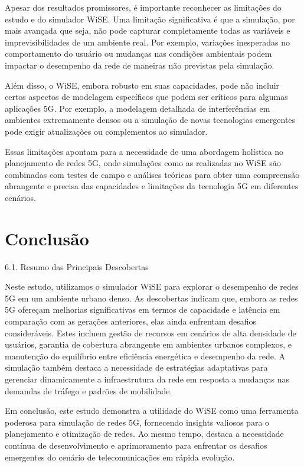 \documentclass[journal]{IEEEtran}
\begin{document}
Apesar dos resultados promissores, é importante reconhecer as limitações do estudo e do simulador WiSE. Uma limitação significativa é que a simulação, por mais avançada que seja, não pode capturar completamente todas as variáveis e imprevisibilidades de um ambiente real. Por exemplo, variações inesperadas no comportamento do usuário ou mudanças nas condições ambientais podem impactar o desempenho da rede de maneiras não previstas pela simulação.

Além disso, o WiSE, embora robusto em suas capacidades, pode não incluir certos aspectos de modelagem específicos que podem ser críticos para algumas aplicações 5G. Por exemplo, a modelagem detalhada de interferências em ambientes extremamente densos ou a simulação de novas tecnologias emergentes pode exigir atualizações ou complementos ao simulador.

Essas limitações apontam para a necessidade de uma abordagem holística no planejamento de redes 5G, onde simulações como as realizadas no WiSE são combinadas com testes de campo e análises teóricas para obter uma compreensão abrangente e precisa das capacidades e limitações da tecnologia 5G em diferentes cenários.

\section{Conclusão}

6.1. Resumo das Principais Descobertas

Neste estudo, utilizamos o simulador WiSE para explorar o desempenho de redes 5G em um ambiente urbano denso. As descobertas indicam que, embora as redes 5G ofereçam melhorias significativas em termos de capacidade e latência em comparação com as gerações anteriores, elas ainda enfrentam desafios consideráveis. Estes incluem gestão de recursos em cenários de alta densidade de usuários, garantia de cobertura abrangente em ambientes urbanos complexos, e manutenção do equilíbrio entre eficiência energética e desempenho da rede. A simulação também destaca a necessidade de estratégias adaptativas para gerenciar dinamicamente a infraestrutura da rede em resposta a mudanças nas demandas de tráfego e padrões de mobilidade.

Em conclusão, este estudo demonstra a utilidade do WiSE como uma ferramenta poderosa para simulação de redes 5G, fornecendo insights valiosos para o planejamento e otimização de redes. Ao mesmo tempo, destaca a necessidade contínua de desenvolvimento e aprimoramento para enfrentar os desafios emergentes do cenário de telecomunicações em rápida evolução.
\end{document}
